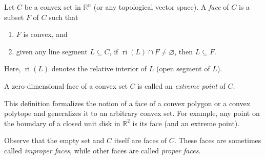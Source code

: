 \documentclass[12pt]{article}
\begin{document}
Let $C$ be a convex set in $\mathbb{R}^n$ (or any topological vector
space).  A \emph{face} of $C$ is a subset $F$ of $C$ such that
\begin{enumerate}
\item $F$ is convex, and 
\item given any line segment $L\subseteq C$, if
$\operatorname{ri}(L)\cap F\ne \varnothing$, then $L\subseteq F$.
\end{enumerate}
Here, $\operatorname{ri}(L)$ denotes the relative interior of $L$
(open segment of $L$).

A zero-dimensional face of a convex set $C$ is called an \emph{extreme
point} of $C$.

This definition formalizes the notion of a face of a convex polygon or
a convex polytope and generalizes it to an arbitrary convex set.  For
example, any point on the boundary of a closed unit disk in
$\mathbb{R}^2$ is its face (and an extreme point).

Observe that the empty set and $C$ itself are faces of $C$.  These
faces are sometimes called \emph{improper faces}, while other faces
are called \emph{proper faces}.
\end{document}
